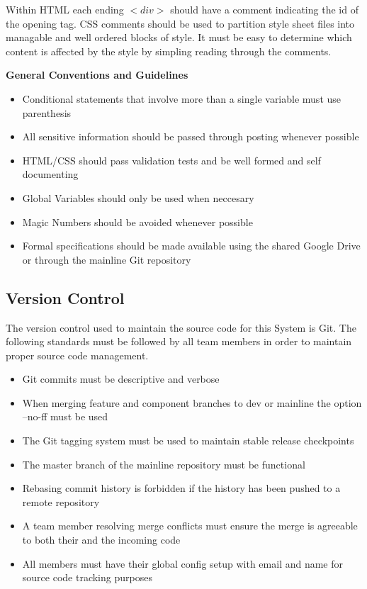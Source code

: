 \documentclass[12pt]{IEEEtran}
\begin{document}
	Within HTML each ending $<div>$ should have a comment indicating the id of the opening tag. CSS comments should be 	used to partition style sheet files into managable and well ordered blocks of style. It must be easy to determine which 			content is affected by the style by simpling reading through the comments.

	\bfseries General Conventions and Guidelines  \mdseries

	\begin{itemize}
		\item Conditional statements that involve more than a single variable must use parenthesis
		\item All sensitive information should be passed through posting whenever possible
		\item HTML/CSS should pass validation tests and be well formed and self documenting
		\item Global Variables should only be used when neccesary
		\item Magic Numbers should be avoided whenever possible 
		\item Formal specifications should be made available using the shared Google Drive or through the mainline Git repository
	\end{itemize}

\subsection{Version Control}
\label{subsec:git}

	The version control used to maintain the source code for this System is Git. The following standards must be followed by all team members in order to maintain proper source code management.
	\begin{itemize}
		\item Git commits must be descriptive and verbose
		\item When merging feature and component branches to dev or mainline the option --no-ff must be used
		\item The Git tagging system must be used to maintain stable release checkpoints
		\item The master branch of the mainline repository must be functional
		\item Rebasing commit history is forbidden if the history has been pushed to a remote repository
		\item A team member resolving merge conflicts must ensure the merge is agreeable to both their and the incoming code
		\item All members must have their global config setup with email and name for source code tracking purposes
	\end{itemize}
	
\end{document}
